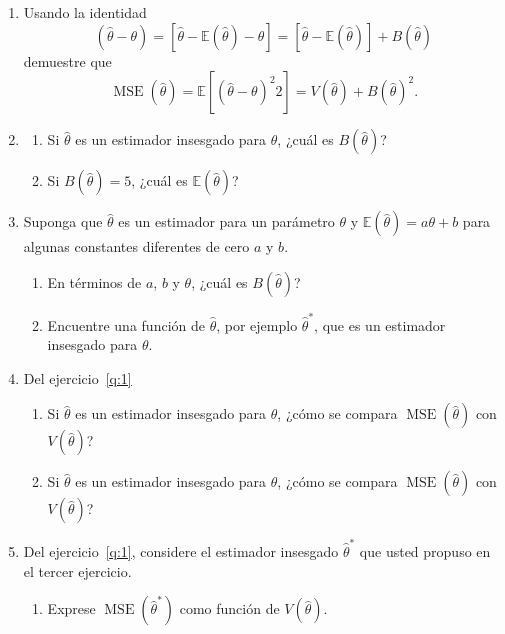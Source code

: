 \documentclass[a4paper]{scrreprt}
\begin{document}
\begin{enumerate}
\item\label{q:1} Usando la identidad \[ \left(\hat{\theta}-\theta\right)=\left[\hat{\theta}-\mathds{E}\left(\hat{\theta}\right)-\theta\right]=\left[\hat{\theta}-\mathds{E}\left(\hat{\theta}\right)\right]+B\left(\hat{\theta}\right) \] demuestre que \[ \operatorname{MSE}\left(\hat{\theta}\right)=\mathds{E}\left[{\left(\hat{\theta}-\theta\right)}^{2}{2}\right]=V\left(\hat{\theta}\right)+{B\left(\hat{\theta}\right)}^{2}. \]

\item\label{q:2}
	\begin{enumerate}
		\item\label{q:2.a} Si $\hat{\theta}$ es un estimador insesgado para $\theta$, ¿cuál es $B\left(\hat{\theta}\right)$?
		\item\label{q:2.b} Si $B\left(\hat{\theta}\right)=5$, ¿cuál es $\mathds{E}\left(\hat{\theta}\right)$?
	\end{enumerate}
	\item\label{q:3} Suponga que $\hat{\theta}$ es un estimador para un parámetro $\theta$ y $\mathds{E}\left(\hat{\theta}\right)=a\theta+b$ para algunas constantes diferentes de cero $a$ y $b$.
	\begin{enumerate}
		\item\label{q:3.a} En términos de $a$, $b$ y $\theta$, ¿cuál es $B\left(\hat{\theta}\right)$?
		\item\label{q:3.b} Encuentre una función de $\hat{\theta}$, por ejemplo $\hat{\theta}^{\ast}$, que es un estimador insesgado para $\theta$.
	\end{enumerate}
	\item\label{q:4} Del ejercicio~\eqref{q:1}
	\begin{enumerate}
		\item\label{q:4.a} Si $\hat{\theta}$ es un estimador insesgado para $\theta$, ¿cómo se compara $\operatorname{MSE}\left(\hat{\theta}\right)$ con $V\left(\hat{\theta}\right)$?
		\item\label{q:4.b} Si $\hat{\theta}$ es un estimador insesgado para $\theta$, ¿cómo se compara $\operatorname{MSE}\left(\hat{\theta}\right)$ con $V\left(\hat{\theta}\right)$?
	\end{enumerate}
	\item\label{q:5} Del ejercicio~\eqref{q:1}, considere el estimador insesgado $\hat{\theta}^{\ast}$ que usted propuso en el tercer ejercicio.
	\begin{enumerate}
		\item\label{q:5.a} Exprese $\operatorname{MSE}\left(\hat{\theta}^{\ast}\right)$ como función de $V\left(\hat{\theta}\right)$.

\end{enumerate}
\end{enumerate}
\end{document}
